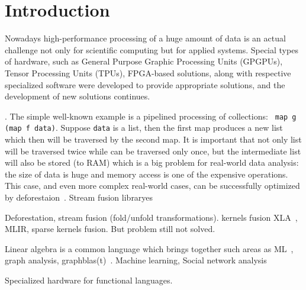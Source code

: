 \section{Introduction}

Nowadays high-performance processing of a huge amount of data is an actual challenge not only for scientific computing but for applied systems.
Special types of hardware, such as General Purpose Graphic Processing Units (GPGPUs), Tensor Processing Units (TPUs), FPGA-based solutions, along with respective specialized software were developed to provide appropriate solutions, and the development of new solutions continues.

. The simple well-known example is a pipelined processing of collections: \verb| map g (map f data)|. Suppose \verb|data| is a list, then the first map produces a new list which then will be traversed by the second map. It is important that not only list will be traversed twice while can be traversed only once, but the intermediate list will also be stored (to RAM) which is a big problem for real-world data analysis: the size of data is huge and memory access is one of the expensive operations.
This case, and even more complex real-world cases, can be successfully optimized by deforestaion~\cite{!!!}. Stream fusion libraryes~\cite{!!!}

Deforestation, stream fusion (fold/unfold transformations). kernels fusion XLA~\cite{XLA}, MLIR, sparse kernels fusion.  But problem still not solved. 

Linear algebra is a common language which brings together such areas as 
ML~\cite{fusion-boosting-memory-computations}, graph analysis, graphblas(t)~\cite{graphblast}.  Machine learning, Social network analysis

Specialized hardware for functional languages.
